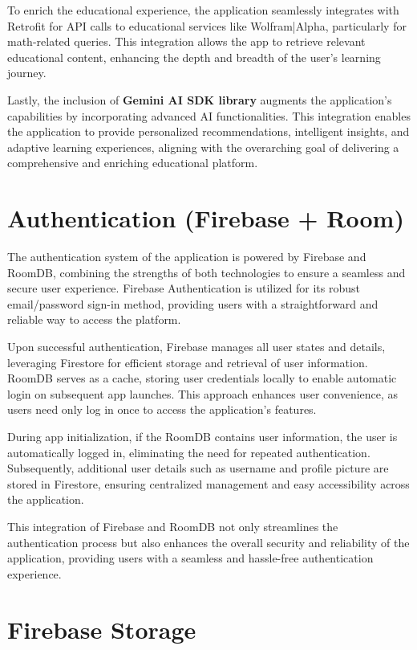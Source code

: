 To enrich the educational experience, the application seamlessly integrates with Retrofit for API calls to educational services like Wolfram|Alpha, particularly for math-related queries. This integration allows the app to retrieve relevant educational content, enhancing the depth and breadth of the user's learning journey.

Lastly, the inclusion of \textbf{Gemini AI SDK library} augments the application's capabilities by incorporating advanced AI functionalities. This integration enables the application to provide personalized recommendations, intelligent insights, and adaptive learning experiences, aligning with the overarching goal of delivering a comprehensive and enriching educational platform.

\section{Authentication (Firebase + Room)}
The authentication system of the application is powered by Firebase and RoomDB, combining the strengths of both technologies to ensure a seamless and secure user experience. Firebase Authentication is utilized for its robust email/password sign-in method, providing users with a straightforward and reliable way to access the platform.

Upon successful authentication, Firebase manages all user states and details, leveraging Firestore for efficient storage and retrieval of user information. RoomDB serves as a cache, storing user credentials locally to enable automatic login on subsequent app launches. This approach enhances user convenience, as users need only log in once to access the application's features.

During app initialization, if the RoomDB contains user information, the user is automatically logged in, eliminating the need for repeated authentication. Subsequently, additional user details such as username and profile picture are stored in Firestore, ensuring centralized management and easy accessibility across the application.

This integration of Firebase and RoomDB not only streamlines the authentication process but also enhances the overall security and reliability of the application, providing users with a seamless and hassle-free authentication experience.

\section{Firebase Storage}

